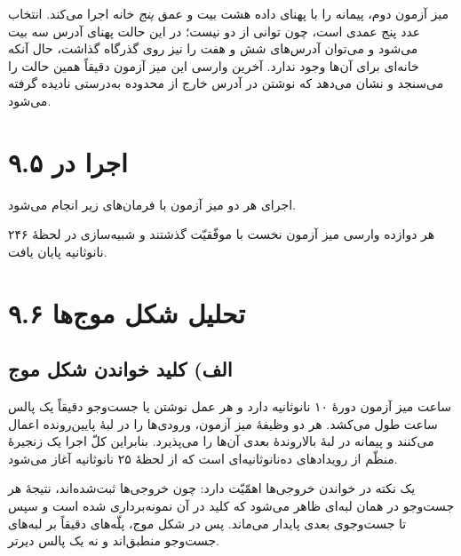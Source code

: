 \documentclass[12pt,a4paper]{article}
\begin{document}

	میز آزمون دوم، پیمانه را با پهنای داده هشت بیت و عمق \emph{پنج} خانه اجرا می‌کند. انتخاب عدد پنج عمدی است، چون توانی از دو نیست؛ در این حالت پهنای آدرس سه بیت می‌شود و می‌توان آدرس‌های شش و هفت را نیز روی گذرگاه گذاشت، حال آنکه خانه‌ای برای آن‌ها وجود ندارد. آخرین وارسی این میز آزمون دقیقاً همین حالت را می‌سنجد و نشان می‌دهد که نوشتن در آدرس خارج از محدوده به‌درستی نادیده گرفته می‌شود.


	\section*{۹.۵ اجرا در }
	اجرای هر دو میز آزمون با فرمان‌های زیر انجام می‌شود.



	هر دوازده وارسی میز آزمون نخست با موفّقیّت گذشتند و شبیه‌سازی در لحظهٔ ۲۴۶ نانوثانیه پایان یافت.


	\section*{۹.۶ تحلیل شکل موج‌ها}
	\subsection*{الف) کلید خواندن شکل موج}
	ساعت میز آزمون دورهٔ ۱۰ نانوثانیه دارد و هر عمل نوشتن یا جست‌وجو دقیقاً یک پالس ساعت طول می‌کشد. هر دو وظیفهٔ میز آزمون، ورودی‌ها را در لبهٔ پایین‌رونده اعمال می‌کنند و پیمانه در لبهٔ بالاروندهٔ بعدی آن‌ها را می‌پذیرد. بنابراین کلّ اجرا یک زنجیرهٔ منظّم از رویدادهای ده‌نانوثانیه‌ای است که از لحظهٔ ۲۵ نانوثانیه آغاز می‌شود.

	یک نکته در خواندن خروجی‌ها اهمّیّت دارد: چون خروجی‌ها ثبت‌شده‌اند، نتیجهٔ هر جست‌وجو در همان لبه‌ای ظاهر می‌شود که کلید در آن نمونه‌برداری شده است و سپس تا جست‌وجوی بعدی پایدار می‌ماند. پس در شکل موج، پلّه‌های  دقیقاً بر لبه‌های جست‌وجو منطبق‌اند و نه یک پالس دیرتر.
\end{document}
